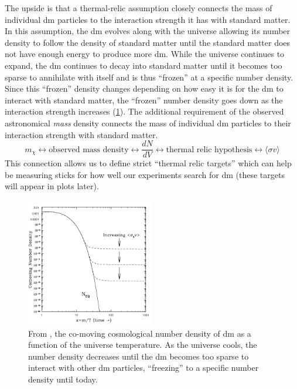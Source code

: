 The upside is that a thermal-relic assumption closely connects the mass of individual \ac{dm}
particles to the interaction strength it has with standard matter. In this assumption, the \ac{dm}
evolves along with the universe allowing its number density to follow the density of standard
matter until the standard matter does not have enough energy to produce more \ac{dm}. While the
universe continues to expand, the \ac{dm} continues to decay into standard matter until it becomes
too sparse to annihilate with itself and is thus ``frozen'' at a specific number density. Since
this ``frozen'' density changes depending on how easy it is for the \ac{dm} to interact with
standard matter, the ``frozen'' number density goes down as the interaction strength increases
(\cref{fig:number-density}). The additional requirement of the observed astronomical \emph{mass}
density connects the mass of individual \ac{dm} particles to their interaction strength with
standard matter.
\begin{equation}\label{eqn:dm-mass-interaction-strength-connection}
  m_\chi \leftrightarrow \text{observed mass density}
  \leftrightarrow \frac{dN}{dV} \leftrightarrow
  \text{thermal relic hypothesis} \leftrightarrow
  \langle\sigma v\rangle
\end{equation}
This connection allows us to define strict ``thermal relic targets'' which can help be measuring
sticks for how well our experiments search for \ac{dm} (these targets will appear in plots later).

\begin{figure}
  \centering
  \includegraphics[width=0.5\textwidth]{figures/theory/number-density-at-freeze-out.png}
  \caption{
    From \cite{thermal-freezeout-diagram-1996}, the co-moving cosmological number density of \ac{dm} as a function of the universe
    temperature. As the universe cools, the number density decreases until the \ac{dm}
    becomes too sparse to interact with other \ac{dm} particles, ``freezing'' to a specific
    number density until today.
  }
  \label{fig:number-density}
\end{figure}

